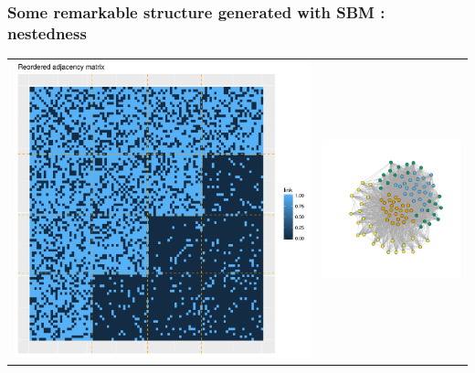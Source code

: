 \documentclass[nopagenumber,9pt]{beamer}
\begin{document}
\begin{frame}
\frametitle{Some remarkable structure generated with SBM : nestedness}

\centering
\begin{tabular}{cc}
 \includegraphics[scale=.2]{plots/sbm/Nested_reordered_adja_with_groups.png}&
\includegraphics[scale=.2]{plots/sbm/Nested_graphe_with_colors.png} 
 \end{tabular}


\end{frame}
\end{document}

